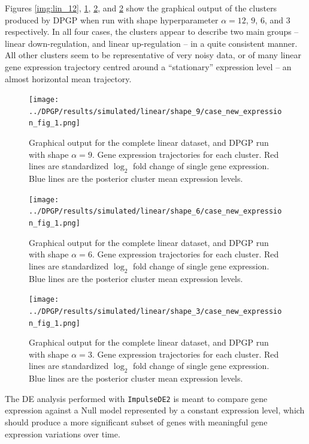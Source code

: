 Figures \ref{img:lin_12}, \ref{img:lin_9}, \ref{img:lin_6}, and \ref{img:lin_6} show the graphical output of the clusters produced by DPGP when run with shape hyperparameter $\alpha=12$, $9$, $6$, and $3$ respectively. In all four cases, the clusters appear to describe two main groups -- linear down-regulation, and linear up-regulation -- in a quite consistent manner. All other clusters seem to be representative of very noisy data, or of many linear gene expression trajectory centred around a ``stationary'' expression level -- an almost horizontal mean trajectory.

\begin{figure}[!hp]
    \centering
    \texttt{[image: ../DPGP/results/simulated/linear/shape\_9/case\_new\_expression\_fig\_1.png]}
    \caption[DPGP output for linear dataset, shape 9]{Graphical output for the complete linear dataset, and DPGP run with shape $\alpha=9$. Gene expression trajectories for each cluster. Red lines are standardized $\log_{2}$ fold change of single gene expression. Blue lines are the posterior cluster mean expression levels.}\label{img:lin_9}
\end{figure}

\begin{figure}[!hp]
    \centering
    \texttt{[image: ../DPGP/results/simulated/linear/shape\_6/case\_new\_expression\_fig\_1.png]}
    \caption[DPGP output for linear dataset, shape 6]{Graphical output for the complete linear dataset, and DPGP run with shape $\alpha=6$. Gene expression trajectories for each cluster. Red lines are standardized $\log_{2}$ fold change of single gene expression. Blue lines are the posterior cluster mean expression levels.}\label{img:lin_6}
\end{figure}

\begin{figure}[!hp]
    \centering
    \texttt{[image: ../DPGP/results/simulated/linear/shape\_3/case\_new\_expression\_fig\_1.png]}
    \caption[DPGP output for linear dataset, shape 3]{Graphical output for the complete linear dataset, and DPGP run with shape $\alpha=3$. Gene expression trajectories for each cluster. Red lines are standardized $\log_{2}$ fold change of single gene expression. Blue lines are the posterior cluster mean expression levels.}\label{img:lin_3}
\end{figure}

The DE analysis performed with \texttt{ImpulseDE2} is meant to compare gene expression against a Null model represented by a constant expression level, which should produce a more significant subset of genes with meaningful gene expression variations over time.

